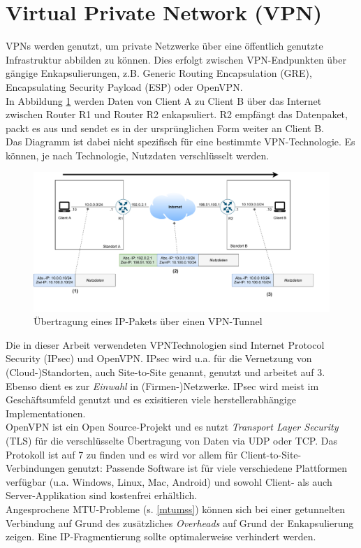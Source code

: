 \section{Virtual Private Network (VPN)}\label{vpn}
\gls{VPN}s werden genutzt, um private Netzwerke über eine öffentlich genutzte Infrastruktur abbilden zu können. Dies erfolgt zwischen \gls{VPN}-Endpunkten über gängige Enkapsulierungen, z.B. Generic Routing Encapsulation (GRE), Encapsulating Security Payload (ESP) oder OpenVPN.\\
In Abbildung \ref{grafik: vpn-example} werden Daten von \gls{Client} A zu \gls{Client} B über das Internet zwischen Router R1 und Router R2 enkapsuliert. R2 empfängt das Datenpaket, packt es aus und sendet es in der ursprünglichen Form weiter an \gls{Client} B.\\
Das Diagramm ist dabei nicht spezifisch für eine bestimmte \gls{VPN}-Technologie. Es können, je nach Technologie, Nutzdaten verschlüsselt werden. 
\begin{figure}[h]
  \centering
  \includegraphics[scale=0.65]{Figures/vpn-example.pdf}
  \caption{Übertragung eines IP-Pakets über einen VPN-Tunnel}
  \label{grafik: vpn-example}
\end{figure}\FloatBarrier

Die in dieser Arbeit verwendeten \gls{VPN}\-Technologien sind Internet Protocol Security (\gls{IPsec}) und OpenVPN. \gls{IPsec} wird u.a. für die Vernetzung von (Cloud-)Standorten, auch \gls{Site-to-Site} genannt, genutzt und arbeitet auf  3. Ebenso dient es zur \textit{Einwahl} in (Firmen-)Netzwerke. \gls{IPsec} wird meist im Geschäftsumfeld genutzt und es exisitieren viele herstellerabhängige Implementationen.\\
OpenVPN ist ein Open Source-Projekt und es nutzt \textit{Transport Layer Security} (TLS) für die verschlüsselte Übertragung von Daten via \gls{UDP} oder \gls{TCP}. Das Protokoll ist auf  7 zu finden und es wird vor allem für \gls{Client-to-Site}-Verbindungen genutzt: Passende Software ist für viele verschiedene Plattformen verfügbar (u.a. Windows, Linux, Mac, Android) und sowohl \gls{Client}- als auch Server-Applikation sind kostenfrei erhältlich.\\
Angesprochene MTU-Probleme (s. \ref{mtumss}) können sich bei einer getunnelten Verbindung auf Grund des zusätzliches \textit{Overheads} auf Grund der Enkapsulierung zeigen. Eine IP-Fragmentierung sollte optimalerweise verhindert werden.

